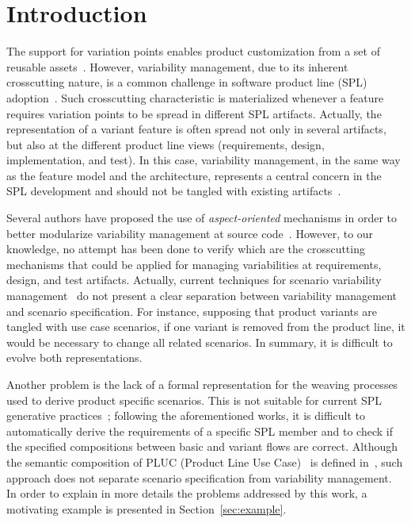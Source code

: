 \documentclass{acm_proc_article-sp}
\begin{document}

%
\section{Introduction}
%
The support for variation points enables product
customization from a set of reusable
assets~\cite{phol-spl-book}. However, variability management, due to
its inherent crosscutting nature, is a common challenge in software
product line (SPL) adoption~\cite{northrop-spl-book,phol-spl-book}.
Such crosscutting characteristic is materialized whenever a feature
requires variation points to be spread in different SPL artifacts. Actually, 
the representation of a variant feature is often spread not only 
in several artifacts, but also at the different product line views (requirements, 
design, implementation, and test). In this case, variability management, in 
the same way as the feature model and the architecture, represents a central concern in the SPL 
development and should not be tangled with existing artifacts~\cite{phol-spl-book}.   
 
Several authors have proposed the use of \emph{aspect-oriented} mechanisms in order to better modularize variability management at source code~\cite{alves-gpce-06,mmedeiros-lawasp-2007}. However, to our knowledge, no attempt has been done to verify which are the crosscutting mechanisms that could be applied for managing variabilities at requirements, design, and test artifacts. Actually, current techniques for scenario variability management~\cite{favaro-icsr-98,bertolino-esec-2003,eriksson-splc-2005} do 
not present a clear separation between variability management and scenario specification. For instance, supposing that  product variants are tangled with  use case scenarios, if one variant is removed from the product line, it would be necessary to change all related scenarios. In summary, it is difficult to evolve both representations. 

Another problem is the lack of a formal representation for the weaving processes used 
to derive product specific scenarios. This is not suitable for current SPL generative 
practices~\cite{krueger-cacm-200712}; following the aforementioned works, it is difficult to automatically derive 
the requirements of a specific SPL member and to check if the specified compositions 
between basic and variant flows are correct.  Although  the semantic composition of PLUC (Product 
Line Use Case)~\cite{bertolino-esec-2003} is defined in~\cite{fantechi-splc-2004}, such approach 
does not separate scenario specification from variability management. In order to explain in more details 
the problems addressed by this work, a motivating example is presented  in Section~\ref{sec:example}.  
\end{document}
